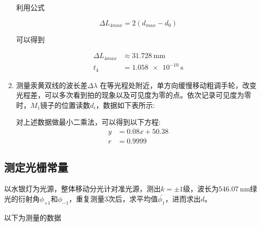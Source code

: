 \documentclass[a4paper]{article}
\begin{document}
\begin{changemargin}{1cm}{1cm}
\begin{spacing}{1.6}
\begin{enumerate}
                  利用公式

                  $$\Delta L_{4max}=2(d_{max}-d_0)$$

                  可以得到

                  $$\begin{aligned}
                          \Delta L_{4max} & \approx \SI{31.728}{\mm} \\
                          t_4             & =\SI{1.058e-10}{\s}
                      \end{aligned}$$

            \item 测量汞黄双线的波长差$\Delta\lambda$
                  在等光程处附近，单方向缓慢移动粗调手轮，改变光程差，可以多次看到拍的现象以及可见度为零的点。依次记录可见度为零时，$M_1$镜子的位置读数$d_i$，数据如下表所示:

                  \begin{table}[htbp]
                      \centering
                      \captionsetup{justification=centering,margin=2cm}
                      \caption{\label{tab:tab_data2}襯比度為最低時位置实验数据表}
                  \end{table}\par

                  对上述数据做最小二乘法，可以得到以下方程:
                  $$\begin{aligned}
                          y & = 0.08x+50.38 \\
                          r & =0.9999
                      \end{aligned}$$




        \end{enumerate}
    \end{spacing}

    \clearpage

    \subsection{测定光栅常量}
    \begin{spacing}{1.6}
        以水银灯为光源，整体移动分光计对准光源，测出$k=\pm1$级，波长为$\SI{546.07}{\nm}$绿光的衍射角$\phi_{+1}$和$\phi_{-1}$，重复测量3次后，求平均值$\bar{\phi_1}$，进而求出$d$。\par
        以下为测量的数据
    \end{spacing}


\end{changemargin}
\end{document}
